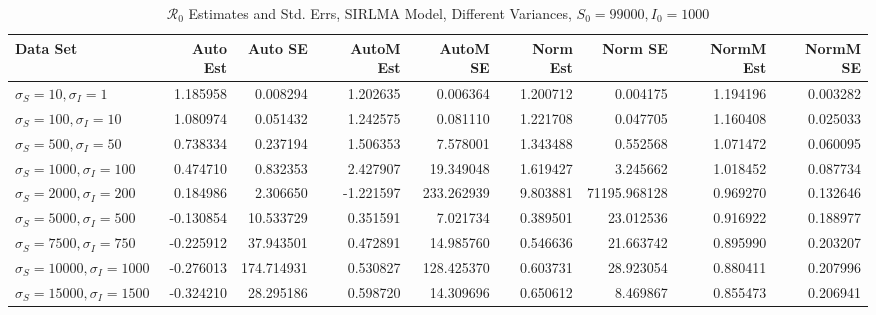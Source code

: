 \documentclass[12pt]{article}
\newcommand{\rr}{\ensuremath{\mathcal{R}_0}}
\begin{document}
\begin{table}[H]
	
	\caption{$\rr$ Estimates and Std. Errs, SIRLMA Model,
		Different Variances, 
		$S_0 = 99000, I_0 = 1000$}
	\begin{footnotesize}
		\hskip -2cm
	\begin{tabular}{l|r|r|r|r|r|r|r|r}
		\hline
		Data Set & Auto Est & Auto SE & AutoM Est & AutoM SE & Norm Est & Norm SE & NormM Est & NormM SE\\
		\hline
		$\sigma_S = 10, \sigma_I = 1$ & 1.185958 & 0.008294 & 1.202635 & 0.006364 & 1.200712 & 0.004175 & 1.194196 & 0.003282\\
		\hline
		$\sigma_S = 100, \sigma_I = 10$ & 1.080974 & 0.051432 & 1.242575 & 0.081110 & 1.221708 & 0.047705 & 1.160408 & 0.025033\\
		\hline
		$\sigma_S = 500, \sigma_I = 50$ & 0.738334 & 0.237194 & 1.506353 & 7.578001 & 1.343488 & 0.552568 & 1.071472 & 0.060095\\
		\hline
		$\sigma_S = 1000, \sigma_I = 100$ & 0.474710 & 0.832353 & 2.427907 & 19.349048 & 1.619427 & 3.245662 & 1.018452 & 0.087734\\
		\hline
		$\sigma_S = 2000, \sigma_I = 200$ & 0.184986 & 2.306650 & -1.221597 & 233.262939 & 9.803881 & 71195.968128 & 0.969270 & 0.132646\\
		\hline
		$\sigma_S = 5000, \sigma_I = 500$ & -0.130854 & 10.533729 & 0.351591 & 7.021734 & 0.389501 & 23.012536 & 0.916922 & 0.188977\\
		\hline
		$\sigma_S = 7500, \sigma_I = 750$ & -0.225912 & 37.943501 & 0.472891 & 14.985760 & 0.546636 & 21.663742 & 0.895990 & 0.203207\\
		\hline
		$\sigma_S = 10000, \sigma_I = 1000$ & -0.276013 & 174.714931 & 0.530827 & 128.425370 & 0.603731 & 28.923054 & 0.880411 & 0.207996\\
		\hline
		$\sigma_S = 15000, \sigma_I = 1500$ & -0.324210 & 28.295186 & 0.598720 & 14.309696 & 0.650612 & 8.469867 & 0.855473 & 0.206941\\
		\hline
	\end{tabular}
\end{footnotesize}
\end{table}
\end{document}
